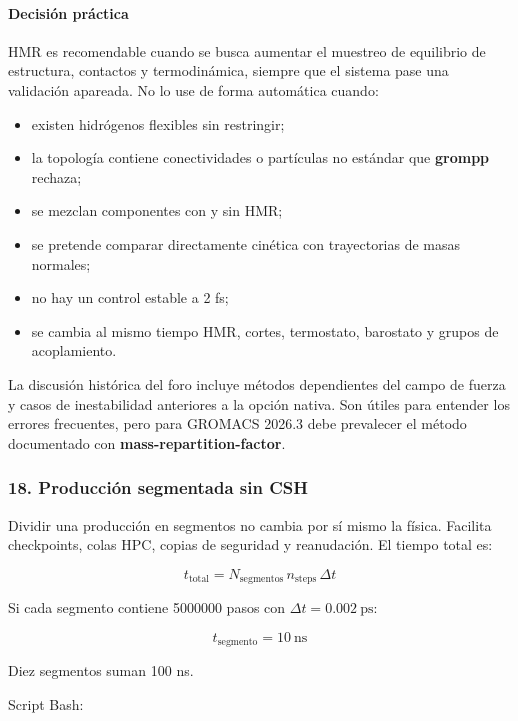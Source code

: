\documentclass[
  spanish,
  11pt,
  a4paper]{article}
\providecommand{\tightlist}{%
  \setlength{\itemsep}{0pt}\setlength{\parskip}{0pt}}
\begin{document}
\paragraph{Decisión práctica}\label{decisiuxf3n-pruxe1ctica}

HMR es recomendable cuando se busca aumentar el muestreo de equilibrio
de estructura, contactos y termodinámica, siempre que el sistema pase
una validación apareada. No lo use de forma automática cuando:

\begin{itemize}
\tightlist
\item
  existen hidrógenos flexibles sin restringir;
\item
  la topología contiene conectividades o partículas no estándar que
  \textbf{grompp} rechaza;
\item
  se mezclan componentes con y sin HMR;
\item
  se pretende comparar directamente cinética con trayectorias de masas
  normales;
\item
  no hay un control estable a 2 fs;
\item
  se cambia al mismo tiempo HMR, cortes, termostato, barostato y grupos
  de acoplamiento.
\end{itemize}

La discusión histórica del foro incluye métodos dependientes del campo
de fuerza y casos de inestabilidad anteriores a la opción nativa. Son
útiles para entender los errores frecuentes, pero para GROMACS 2026.3
debe prevalecer el método documentado con
\textbf{mass-repartition-factor}.

\subsubsection{18. Producción segmentada sin
CSH}\label{producciuxf3n-segmentada-sin-csh}

Dividir una producción en segmentos no cambia por sí mismo la física.
Facilita checkpoints, colas HPC, copias de seguridad y reanudación. El
tiempo total es:

\[
t_{\mathrm{total}} =
N_{\mathrm{segmentos}}\,
n_{\mathrm{steps}}\,
\Delta t
\]

Si cada segmento contiene 5000000 pasos con
\(\Delta t=0.002\ \mathrm{ps}\):

\[
t_{\mathrm{segmento}}=10\ \mathrm{ns}
\]

Diez segmentos suman 100 ns.

Script Bash:
\end{document}
